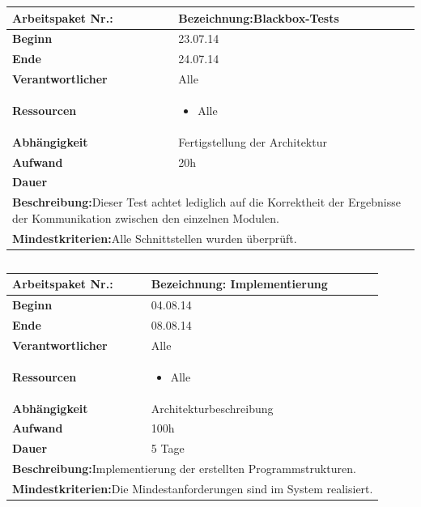 \documentclass[fontsize=12pt,paper=a4,twoside]{scrartcl}
\begin{document}
	\begin{tabular}{|p{5.3cm}|p{9.7cm}|}\hline
		\textbf{Arbeitspaket Nr.:}  & \textbf{Bezeichnung:}Blackbox-Tests \\ \hline \hline
		\textbf{Beginn} & 23.07.14\\ \hline
		\textbf{Ende} & 24.07.14\\ \hline
		\textbf{Verantwortlicher} & Alle\\ \hline
		\textbf{Ressourcen} & \begin{itemize}
			\item Alle
		\end{itemize}    \\ \hline
		\textbf{Abhängigkeit} & Fertigstellung der Architektur\\ \hline
		\textbf{Aufwand} & 20h\\ \hline
		\textbf{Dauer} & \\ \hline
		\multicolumn{2}{|p{15cm}|}{\textbf{Beschreibung:}\newline Dieser Test achtet lediglich  auf die Korrektheit der Ergebnisse der Kommunikation zwischen den einzelnen Modulen. }\\ \hline
		\multicolumn{2}{|p{15cm}|}{\textbf{Mindestkriterien:}\newline Alle Schnittstellen wurden überprüft. }\\ \hline
	\end{tabular}
	
	\begin{verbatim} 
	\end{verbatim}
	
	\begin{tabular}{|p{5.3cm}|p{9.7cm}|}\hline
		\textbf{Arbeitspaket Nr.:}  & \textbf{Bezeichnung:} Implementierung\\ \hline \hline
		\textbf{Beginn} & 04.08.14\\ \hline
		\textbf{Ende} & 08.08.14\\ \hline
		\textbf{Verantwortlicher} & Alle\\ \hline
		\textbf{Ressourcen} & \begin{itemize}
			\item Alle
		\end{itemize}    \\ \hline
		\textbf{Abhängigkeit} & Architekturbeschreibung\\ \hline
		\textbf{Aufwand} & 100h\\ \hline
		\textbf{Dauer} & 5 Tage\\ \hline
		\multicolumn{2}{|p{15cm}|}{\textbf{Beschreibung:}\newline Implementierung der erstellten Programmstrukturen. }\\ \hline
		\multicolumn{2}{|p{15cm}|}{\textbf{Mindestkriterien:}\newline Die Mindestanforderungen sind im System realisiert. }\\ \hline
	\end{tabular}
	
\end{document}
